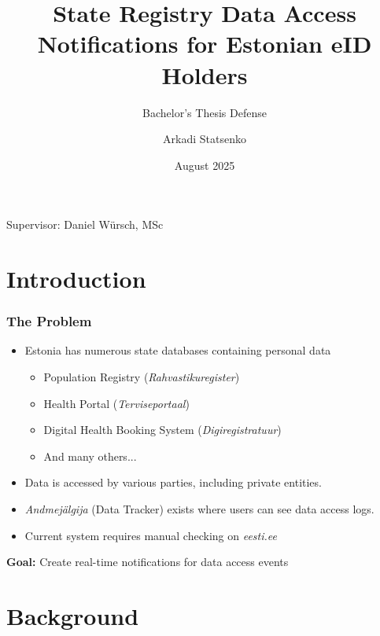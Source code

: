 \documentclass[aspectratio=169,11pt]{beamer}
\title{State Registry Data Access Notifications for Estonian eID Holders}
\subtitle{Bachelor's Thesis Defense}
\author{Arkadi Statsenko}
\institute{University of Tartu\\Computer Science Curriculum}
\date{August 2025}
\begin{document}
\begin{frame}
\titlepage
\begin{center}
\small
Supervisor: Daniel Würsch, MSc
\end{center}
\end{frame}


\section{Introduction}

\begin{frame}
\frametitle{The Problem}
\begin{itemize}
    \item Estonia has numerous state databases containing personal data
    \begin{itemize}
        \item Population Registry (\textit{Rahvastikuregister})
        \item Health Portal (\textit{Terviseportaal})
        \item Digital Health Booking System (\textit{Digiregistratuur})
        \item And many others...
    \end{itemize}
    \item Data is accessed by various parties, including private entities.
    \item {\textit{Andmejälgija} (Data Tracker) exists where users can see data access logs}.
    \item Current system requires manual checking on \textit{eesti.ee}
\end{itemize}

\vspace{0.5cm}
\begin{center}
\textbf{Goal:} Create real-time notifications for data access events
\end{center}
\end{frame}

\section{Background}
\end{document}
